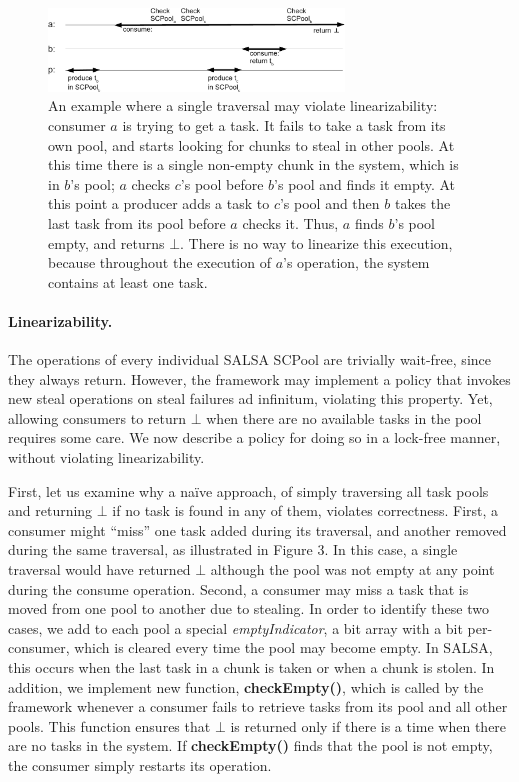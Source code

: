 \begin{figure}[htb]
	\centering
	\includegraphics[width=0.7\textwidth]{figures/linearizability-example}
	\caption{\footnotesize{An example where a single traversal may violate linearizability: consumer $a$ is trying to get a task. It fails to take a task from its own pool, and starts looking for chunks to steal in other pools. At this time there is a single non-empty chunk in the system, which is in $b$'s pool; $a$ checks $c$'s pool before $b$'s pool and finds it empty. At this point a producer adds a task to $c$'s pool and then $b$ takes the last task from its pool before $a$ checks it. Thus, $a$ finds $b$'s pool empty, and returns $\bot$. There is no way to linearize this execution, because throughout the execution of $a$'s operation, the system contains at least one task.}}
	\label{fig:linearizability-example}
\end{figure}

\paragraph{Linearizability.}
The operations of every individual SALSA SCPool are trivially wait-free, since they always return. However, the framework may implement a policy that invokes new steal operations on steal failures ad infinitum, violating this property. Yet, allowing consumers to return $\bot$ when there are no available tasks in the pool requires some care.  We now describe a policy for doing so in a lock-free manner, without violating linearizability. 

First, let us examine why a na\"ive approach, of simply traversing all task pools and returning $\bot$ if no task is found in any of them, violates correctness. First, a consumer might ``miss'' one task added during its traversal, and another removed during the same traversal, as illustrated in Figure 3. In this case, a single traversal would have returned $\bot$ although the pool was not empty at any point during the consume operation. Second, a consumer may miss a task that is moved from one pool to another due to stealing. In order to identify these two cases, we add to each pool a special \emph{emptyIndicator}, a bit array with a bit per-consumer, which is cleared every time the pool may become empty. In SALSA, this occurs when the last task in a chunk is taken or when a chunk is stolen. 
In addition, we implement new function, {\bf checkEmpty()}, which is called by the framework whenever a consumer fails to retrieve tasks from its pool and all other pools. This function ensures that $\bot$ is returned only if there is a time when there are no tasks in the system. If {\bf checkEmpty()} finds that the pool is not empty, the consumer simply restarts its operation. 

